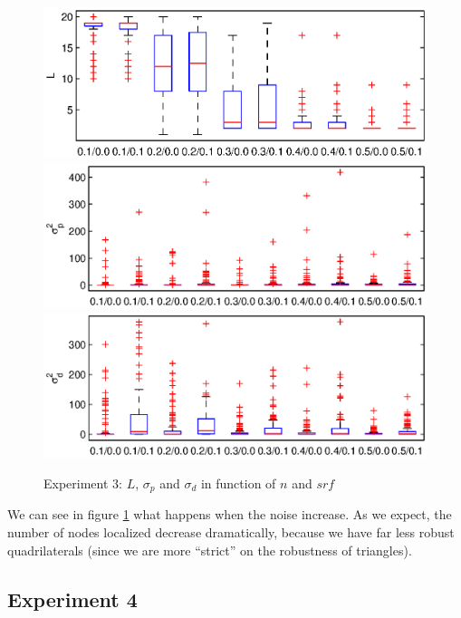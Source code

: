\documentclass[letterpaper, 10 pt, conference]{ieeeconf}  %
\begin{document}
\begin{figure}[ht!]
\centering
\includegraphics[width=1\columnwidth]{set3-L.eps}
\includegraphics[width=1\columnwidth]{set3-sp.eps}
\includegraphics[width=1\columnwidth]{set3-sd.eps}
\caption{\label{figure:set3}Experiment 3: $L$, $\sigma_p$ and $\sigma_d$ in function of $n$ and $srf$}
\end{figure}

We can see in figure \ref{figure:set3} what happens when the noise increase. As we expect, the number of nodes localized decrease dramatically, because we have far less robust quadrilaterals (since we are more ``strict'' on the robustness of triangles). 

\subsection{Experiment 4}



\end{document}
